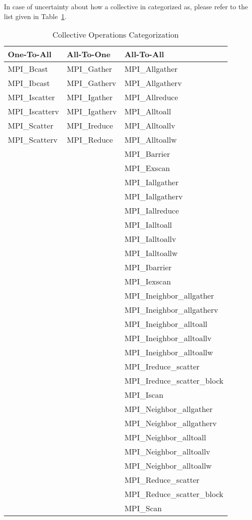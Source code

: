 In case of uncertainty about how a collective in categorized as, please refer to the list given in Table~\ref{tab:coll-cat}.

\begin{table}
  \begin{center}
    \begin{tabular}{|l|l|l|}
      \hline
      One-To-All & All-To-One & All-To-All \\
      \hline
      MPI\_Bcast     & MPI\_Gather   & MPI\_Allgather \\
      MPI\_Ibcast    & MPI\_Gatherv  & MPI\_Allgatherv \\
      MPI\_Iscatter  & MPI\_Igather  & MPI\_Allreduce \\
      MPI\_Iscatterv & MPI\_Igatherv & MPI\_Alltoall \\
      MPI\_Scatter   & MPI\_Ireduce  & MPI\_Alltoallv \\
      MPI\_Scatterv  & MPI\_Reduce   & MPI\_Alltoallw \\
      && MPI\_Barrier \\
      && MPI\_Exscan \\
      && MPI\_Iallgather \\
      && MPI\_Iallgatherv \\
      && MPI\_Iallreduce \\
      && MPI\_Ialltoall \\
      && MPI\_Ialltoallv \\
      && MPI\_Ialltoallw \\
      && MPI\_Ibarrier \\
      && MPI\_Iexscan \\
      && MPI\_Ineighbor\_allgather \\
      && MPI\_Ineighbor\_allgatherv \\
      && MPI\_Ineighbor\_alltoall \\
      && MPI\_Ineighbor\_alltoallv \\
      && MPI\_Ineighbor\_alltoallw \\
      && MPI\_Ireduce\_scatter \\
      && MPI\_Ireduce\_scatter\_block \\
      && MPI\_Iscan \\
      && MPI\_Neighbor\_allgather \\
      && MPI\_Neighbor\_allgatherv \\
      && MPI\_Neighbor\_alltoall \\
      && MPI\_Neighbor\_alltoallv \\
      && MPI\_Neighbor\_alltoallw \\
      && MPI\_Reduce\_scatter \\
      && MPI\_Reduce\_scatter\_block \\
      && MPI\_Scan \\
      \hline
  \end{tabular}
\end{center}
  \caption{Collective Operations Categorization}
  \label{tab:coll-cat}
\end{table}

